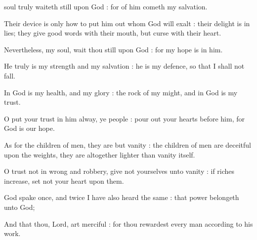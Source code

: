 
 soul truly waiteth still upon God : for of him cometh my salvation.\par
{}
Their device is only how to put him out whom God will exalt : their delight is in lies; they give good words with their mouth, but curse with their heart.\par
{}Nevertheless, my soul, wait thou still upon God : for my hope is in him.\par
{}He truly is my strength and my salvation : he is my defence, so that I shall not fall.\par
{}In God is my health, and my glory : the rock of my might, and in God is my trust.\par
{}O put your trust in him alway, ye people : pour out your hearts before him, for God is our hope.\par
{}As for the children of men, they are but vanity : the children of men are deceitful upon the weights, they are altogether lighter than vanity itself.\par
{}O trust not in wrong and robbery, give not yourselves unto vanity : if riches increase, set not your heart upon them.\par
{}God spake once, and twice I have also heard the same : that power belongeth unto God;\par
{}And that thou, Lord, art merciful : for thou rewardest every man according to his work.\par


